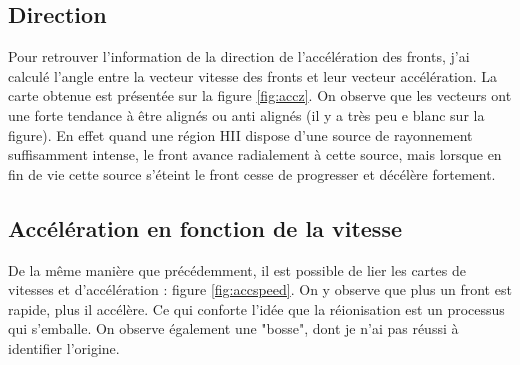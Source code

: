 \subsection{Direction} 

Pour retrouver l'information de la direction de l'accélération des fronts, j'ai calculé l'angle entre la vecteur vitesse des fronts et leur vecteur accélération.
La carte obtenue est présentée sur la figure \ref{fig:accz}.
On observe que les vecteurs ont une forte tendance à être alignés ou anti alignés (il y a très peu e blanc sur la figure).
En effet quand une région HII dispose d'une source de rayonnement suffisamment intense, le front avance radialement à cette source, mais lorsque  en fin de vie cette source s'éteint le front cesse de progresser et décélère fortement.






\subsection{Accélération en fonction de la vitesse}

De la même manière que précédemment, il est possible de lier les cartes de vitesses et d'accélération : figure \ref{fig:accspeed}.
On y observe que plus un front est rapide, plus il accélère.
Ce qui conforte l'idée que la réionisation est un processus qui s'emballe.
On observe également une "bosse", dont je n'ai pas réussi à identifier l'origine.

